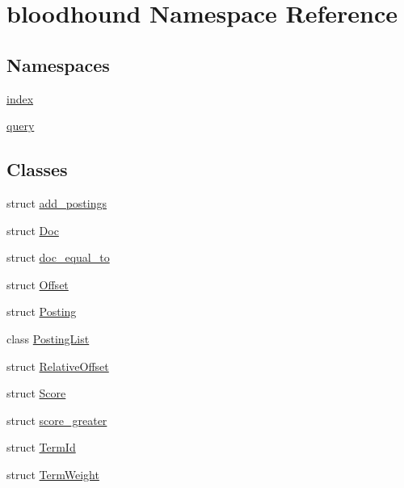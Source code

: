 \hypertarget{namespacebloodhound}{}\section{bloodhound Namespace Reference}
\label{namespacebloodhound}
\subsection*{Namespaces}
\begin{DoxyCompactItemize}
\item 
 \mbox{\hyperlink{namespacebloodhound_1_1index}{index}}
\item 
 \mbox{\hyperlink{namespacebloodhound_1_1query}{query}}
\end{DoxyCompactItemize}
\subsection*{Classes}
\begin{DoxyCompactItemize}
\item 
struct \mbox{\hyperlink{structbloodhound_1_1add__postings}{add\+\_\+postings}}
\item 
struct \mbox{\hyperlink{structbloodhound_1_1Doc}{Doc}}
\item 
struct \mbox{\hyperlink{structbloodhound_1_1doc__equal__to}{doc\+\_\+equal\+\_\+to}}
\item 
struct \mbox{\hyperlink{structbloodhound_1_1Offset}{Offset}}
\item 
struct \mbox{\hyperlink{structbloodhound_1_1Posting}{Posting}}
\item 
class \mbox{\hyperlink{classbloodhound_1_1PostingList}{Posting\+List}}
\item 
struct \mbox{\hyperlink{structbloodhound_1_1RelativeOffset}{Relative\+Offset}}
\item 
struct \mbox{\hyperlink{structbloodhound_1_1Score}{Score}}
\item 
struct \mbox{\hyperlink{structbloodhound_1_1score__greater}{score\+\_\+greater}}
\item 
struct \mbox{\hyperlink{structbloodhound_1_1TermId}{Term\+Id}}
\item 
struct \mbox{\hyperlink{structbloodhound_1_1TermWeight}{Term\+Weight}}
\end{DoxyCompactItemize}
